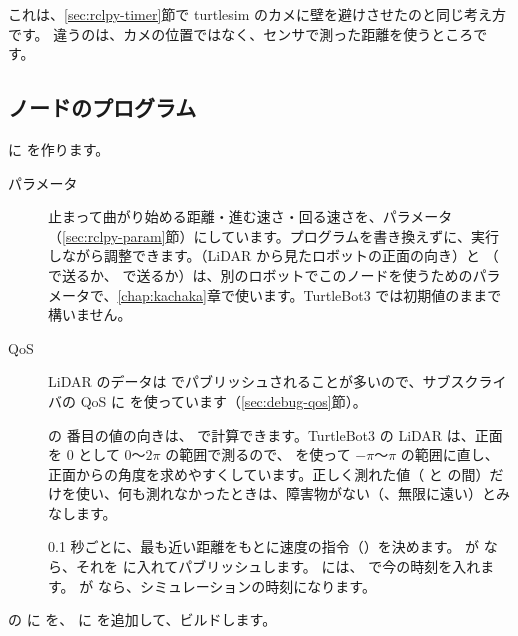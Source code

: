これは、\ref{sec:rclpy-timer}節で turtlesim のカメに壁を避けさせたのと同じ考え方です。
違うのは、カメの位置ではなく、センサで測った距離を使うところです。

\subsection{ノードのプログラム}

 に  を作ります。


\begin{description}
  \item[パラメータ] 止まって曲がり始める距離・進む速さ・回る速さを、パラメータ（\ref{sec:rclpy-param}節）にしています。プログラムを書き換えずに、実行しながら調整できます。（LiDAR から見たロボットの正面の向き）と （ で送るか、 で送るか）は、別のロボットでこのノードを使うためのパラメータで、\ref{chap:kachaka}章で使います。TurtleBot3 では初期値のままで構いません。
  \item[QoS] LiDAR のデータは  でパブリッシュされることが多いので、サブスクライバの QoS に  を使っています（\ref{sec:debug-qos}節）。
  \item[]  の  番目の値の向きは、 で計算できます。TurtleBot3 の LiDAR は、正面を 0 として 0〜$2\pi$ の範囲で測るので、 を使って $-\pi$〜$\pi$ の範囲に直し、正面からの角度を求めやすくしています。正しく測れた値（ と  の間）だけを使い、何も測れなかったときは、障害物がない（、無限に遠い）とみなします。
  \item[] 0.1 秒ごとに、最も近い距離をもとに速度の指令（）を決めます。 が  なら、それを  に入れてパブリッシュします。 には、 で今の時刻を入れます。 が  なら、シミュレーションの時刻になります。
\end{description}

 の  に  を、 に  を追加して、ビルドします。

